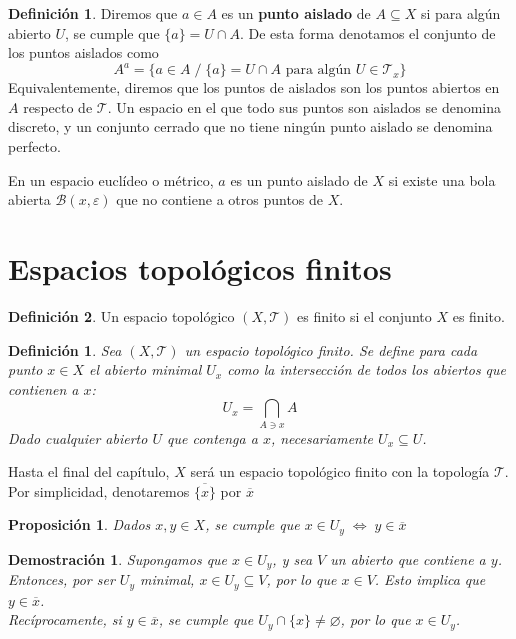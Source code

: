 \documentclass[12pt,twoside]{report}
\newcommand\mc[1]{\mathcal{#1}}
\theoremstyle{azul}
\newtheorem*{propx}{Proposición}
\newtheorem*{demx}{Demostración}
\newtheorem*{defix}{Definición}
\theoremstyle{azul2}
\theoremstyle{plain}
\theoremstyle{definition}
\newtheorem*{defi}{Definición}
\theoremstyle{remark}
\begin{document}
\begin{defi}
Diremos que $a \in A$ es un \textbf{punto aislado} de $A \subseteq X$ si para alg{\'u}n abierto $U$, se cumple que $\{a\}=U \cap A$. De esta forma denotamos el conjunto de los puntos aislados como
$$A^a=\{ a \in A \; / \; \{a\}=U \cap A \text{ para alg{\'u}n } U \in \mc{T}_x\}$$
Equivalentemente, diremos que los puntos de aislados son los puntos abiertos en $A$ respecto de $\mc{T}$. Un espacio en el que todo sus puntos son aislados se denomina discreto, y un conjunto cerrado que no tiene ning{\'u}n punto aislado se denomina perfecto.

En un espacio euclídeo o m{\'e}trico, $a$ es un punto aislado de $X$ si existe una bola abierta $\mc{B}(x,\varepsilon)$ que no contiene a otros puntos de $X$.
\end{defi}

\section{Espacios topológicos finitos}
\begin{defi}
Un espacio topológico $(X,\mc{T})$ es finito si el conjunto $X$ es finito.
\end{defi}

\begin{defix}
Sea $(X,\mc{T})$ un espacio topológico finito. Se define para cada punto $x\in X$ el abierto minimal $U_x$ como la intersección de todos los abiertos que contienen a $x$: $$U_x = \underset{A \ni x}{\bigcap} A$$
Dado cualquier abierto $U$ que contenga a $x$, necesariamente $U_x \subseteq U$.
\end{defix}

Hasta el final del capítulo, $X$ será un espacio topológico finito con la topología $\mc{T}$.\\
Por simplicidad, denotaremos $\overline{\{x\}}$ por $\overline{x}$

\begin{propx}
Dados $x, y \in X$, se cumple que $x\in U_y \; \Leftrightarrow \; y \in \overline{x}$
\end{propx}
\begin{demx}
Supongamos que $x \in U_y$, y sea $V$ un abierto que contiene a $y$. Entonces, por ser $U_y$ minimal, $x\in U_y \subseteq V$, por lo que $x \in V$. Esto implica que $y \in \overline{x}$.\\
Recíprocamente, si $y \in \overline{x}$, se cumple que $U_y \cap \{x\} \neq \varnothing$, por lo que $x\in U_y$.
\end{demx}
\end{document}
